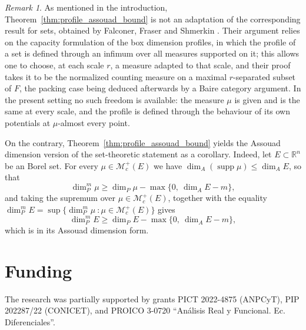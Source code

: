 \documentclass[12pt]{amsart}
\theoremstyle{definition}
\theoremstyle{remark}
\newtheorem{remark}[theorem]{Remark}
\numberwithin{equation}{section}
\begin{document}
\begin{remark}\label{rem:not_adaptation}
As mentioned in the introduction, Theorem~\ref{thm:profile_assouad_bound}
is not an adaptation of the corresponding result for sets, obtained by
Falconer, Fraser and Shmerkin \cite[Theorem 2.2]{falconer2021assouad}. Their argument
relies on the capacity formulation of the box dimension profiles, in
which the profile of a set is defined through an infimum over all
measures supported on it; this allows one to choose, at each scale $r$, a
measure adapted to that scale, and their proof takes it to be the
normalized counting measure on a maximal $r$-separated subset of $F$,
the packing case being deduced afterwards by a Baire category argument.
In the present setting no such freedom is available: the measure $\mu$ is
given and is the same at every scale, and the profile is defined through
the behaviour of its own potentials at $\mu$-almost every point.

On the contrary, Theorem~\ref{thm:profile_assouad_bound} yields the Assouad dimension version of the set-theoretic statement as a corollary. Indeed, let
$E\subset\mathbb{R}^n$ be an Borel set. For every
$\mu\in\mathcal{M}_c^+(E)$ we have $\dim_A(\operatorname{supp}\mu)\leq
\dim_A E$, so that
$$\dim_P^m\mu\geq\dim_P\mu-\max\{0,\ \dim_A E-m\},$$
and taking the supremum over $\mu\in\mathcal{M}_c^+(E)$, together with the equality
$\dim_P^m E=\sup\{\dim_P^m\mu\ : \mu\in\mathcal{M}_c^+(E)\}$ gives
$$\dim_P^m E\geq\dim_P E-\max\{0,\ \dim_A E-m\},$$
which is \cite[Theorem 2.2]{falconer2021assouad} in its Assouad dimension form.
\end{remark}


\section*{Funding}
The research was partially supported by grants PICT 2022-4875 (ANPCyT), PIP 202287/22 (CONICET), and PROICO 3-0720 ``An\'alisis Real y Funcional. Ec. Diferenciales''.
\end{document}
